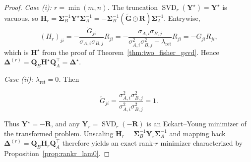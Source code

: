 \documentclass[11pt]{article}
\begin{document}
\begin{proof}
\emph{Case (i): $r = \min(m,n)$.} The truncation $\operatorname{SVD}_r(\mathbf{Y}^\star) = \mathbf{Y}^\star$ is vacuous, so $\mathbf{H}_r = \mathbf{\Sigma}_B^{-1}\mathbf{Y}^\star\mathbf{\Sigma}_A^{-1} = -\mathbf{\Sigma}_B^{-1}(\widetilde{\mathbf{G}}\odot\mathbf{R})\mathbf{\Sigma}_A^{-1}$. Entrywise,
\[
(H_r)_{ji} = -\frac{\widetilde{G}_{ji}}{\sigma_{A,i}\sigma_{B,j}}R_{ji}
= -\frac{\sigma_{A,i}\sigma_{B,j}}{\sigma_{A,i}^2\sigma_{B,j}^2+\lambda_{\mathrm{ret}}}R_{ji}
= -G_{ji}R_{ji},
\]
which is $\mathbf{H}^\star$ from the proof of Theorem~\ref{thm:two_fisher_gsvd}. Hence $\mathbf{\Delta}^{(r)} = \mathbf{Q}_B\mathbf{H}^\star\mathbf{Q}_A^\top = \mathbf{\Delta}^\star$.

\emph{Case (ii): $\lambda_{\mathrm{ret}} = 0$.} Then


$$  
\widetilde{G}_{ji} = \frac{\sigma_{A,i}^2\sigma_{B,j}^2}{ \sigma_{A,i}^2\sigma_{B,j}^2} = 1.
$$ 

Thus $\mathbf{Y}^\star = -\mathbf{R}$, and any
$\mathbf{Y}_r=\operatorname{SVD}_r(-\mathbf{R})$ is an Eckart--Young
minimizer of the transformed problem. Unscaling
$\mathbf{H}_r=\mathbf{\Sigma}_B^{-1}\mathbf{Y}_r\mathbf{\Sigma}_A^{-1}$
and mapping back
$\mathbf{\Delta}^{(r)}=\mathbf{Q}_B\mathbf{H}_r\mathbf{Q}_A^\top$
therefore yields an exact rank-$r$ minimizer characterized by
Proposition~\ref{prop:rankr_lam0}.
\end{proof}

\clearpage
\makeatletter
\setlength{\@fptop}{0pt}
\setlength{\@fpsep}{12pt}
\makeatother
\kforgeAppendixResults
\end{document}
